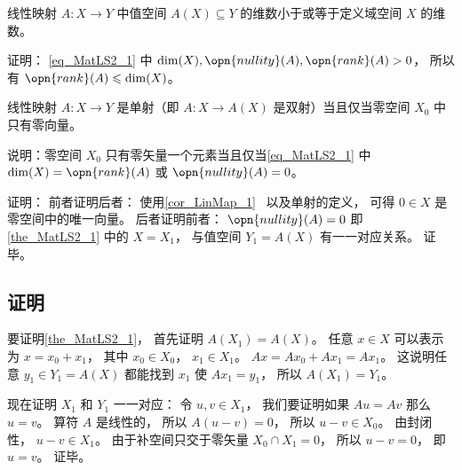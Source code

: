 \begin{corollary}{}
线性映射 $A:X\to Y$ 中值空间 $A(X) \subseteq Y$ 的维数小于或等于定义域空间 $X$ 的维数。
\end{corollary}
证明： \autoref{eq_MatLS2_1} 中 $\dim(X), \opn{nullity}(A), \opn{rank}(A) > 0$， 所以有 $\opn{rank}(A) \leqslant \dim(X)$。

\begin{corollary}{}
线性映射 $A:X\to Y$ 是单射（即 $A:X\to A(X)$ 是双射）当且仅当零空间 $X_0$ 中只有零向量。
\end{corollary}
说明：零空间 $X_0$ 只有零矢量一个元素当且仅当\autoref{eq_MatLS2_1} 中 $\dim(X) = \opn{rank}(A)$ 或 $\opn{nullity}(A) = 0$。

证明： 前者证明后者： 使用\autoref{cor_LinMap_1}~ 以及单射的定义， 可得 $0\in X$ 是零空间中的唯一向量。 后者证明前者： $\opn{nullity}(A) = 0$ 即\autoref{the_MatLS2_1} 中的 $X = X_1$， 与值空间 $Y_1 = A(X)$ 有一一对应关系。 证毕。

\subsection{证明}
要证明\autoref{the_MatLS2_1}， 首先证明 $A(X_1) = A(X)$。 任意 $x\in X$ 可以表示为 $x = x_0 + x_1$， 其中 $x_0\in X_0$， $x_1\in X_1$。 $Ax = A x_0 + A x_1 = A x_1$。 这说明任意 $y_1 \in Y_1 = A(X)$ 都能找到 $x_1$ 使 $A x_1 = y_1$， 所以 $A(X_1) = Y_1$。

现在证明 $X_1$ 和 $Y_1$ 一一对应： 令 $u, v \in X_1$， 我们要证明如果 $Au = Av$ 那么 $u = v$。 算符 $A$ 是线性的， 所以 $A(u-v) = 0$， 所以 $u - v \in X_0$。 由封闭性， $u - v \in X_1$。 由于补空间只交于零矢量 $X_0 \cap X_1 = \qty{0}$， 所以 $u - v = 0$， 即 $u = v$。 证毕。

